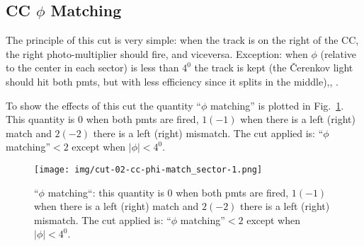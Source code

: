 \clearpage\newpage

\subsection{CC $\phi$ Matching}
The principle of this cut is very simple: when the track is on the right of the CC, the right
photo-multiplier should fire, and viceversa. Exception: when $\phi$ (relative to the center
in each sector) is less than $4^0$ the track is kept (the \v Cerenkov light should hit both
pmts, but with less efficiency since it splits in the middle)\cite{bib:ccmatch},\cite{bib:pc_fxpun}, \cite{bib:pc_osi}.

To show the effects of this cut the quantity ``$\phi$ matching'' is plotted in
Fig.~\ref{fig:ccm_phi}. This quantity is $0$ when both pmts are fired, $1(-1)$ when
there is a left (right) match and $2(-2)$ there is a left (right) mismatch.
The cut applied is:  ``$\phi$ matching''$<2$ except when $|\phi|<4^0$.

\begin{figure}[ht]
  \centering
		\texttt{[image: img/cut-02-cc-phi-match\_sector-1.png]}
		\caption{``$\phi$ matching``: this quantity is $0$ when both pmts are fired, $1(-1)$ when
there is a left (right) match and $2(-2)$ there is a left (right) mismatch.
The cut applied is:  ``$\phi$ matching''$<2$ except when $|\phi|<4^0$.}
 		\label{fig:ccm_phi}
\end{figure}


